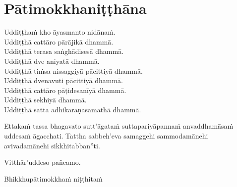 \section{Pātimokkhaniṭṭhāna}
\label{patimokkhanitthana}

Uddiṭṭhaṁ kho āyasmanto nidānaṁ.\\
Uddiṭṭhā cattāro pārājikā dhammā.\\
Uddiṭṭhā terasa saṅghādisesā dhammā.\\
Uddiṭṭhā dve aniyatā dhammā.\\
Uddiṭṭhā tiṁsa nissaggiyā pācittiyā dhammā.\\
Uddiṭṭhā dvenavuti pācittiyā dhammā.\\
Uddiṭṭhā cattāro pāṭidesanīyā dhammā.\\
Uddiṭṭhā sekhiyā dhammā.\\
Uddiṭṭhā satta adhikaraṇasamathā dhammā.


Ettakaṁ tassa bhagavato sutt'āgataṁ suttapariyāpannaṁ anvaddhamāsaṁ uddesaṁ āgacchati. Tattha sabbeh'eva samaggehi sammodamānehi avivadamānehi sikkhitabban''ti.

Vitthār'uddeso pañcamo.

\begin{outro}
  Bhikkhupātimokkhaṁ niṭṭhitaṁ
\end{outro}

\clearpage
